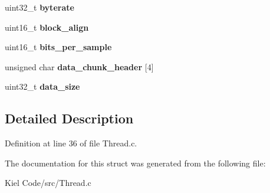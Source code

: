 \begin{DoxyCompactItemize}
uint32\+\_\+t {\bfseries byterate}
\item 
\mbox{\label{struct_w_a_v_h_e_a_d_e_r_a5cef5e91f9d1495fdf2da05b67adcb5e}} 
uint16\+\_\+t {\bfseries block\+\_\+align}
\item 
\mbox{\label{struct_w_a_v_h_e_a_d_e_r_a1eca7ea126c126e0ed765cc1b3cb477d}} 
uint16\+\_\+t {\bfseries bits\+\_\+per\+\_\+sample}
\item 
\mbox{\label{struct_w_a_v_h_e_a_d_e_r_a2c3167f6bf009f7302705afdedc68497}} 
unsigned char {\bfseries data\+\_\+chunk\+\_\+header} \mbox{[}4\mbox{]}
\item 
\mbox{\label{struct_w_a_v_h_e_a_d_e_r_ad8d1eefaf5943258b3d71a799f0ea382}} 
uint32\+\_\+t {\bfseries data\+\_\+size}
\end{DoxyCompactItemize}


\subsection{Detailed Description}


Definition at line 36 of file Thread.\+c.



The documentation for this struct was generated from the following file\+:\begin{DoxyCompactItemize}
\item 
Kiel Code/src/Thread.\+c\end{DoxyCompactItemize}
